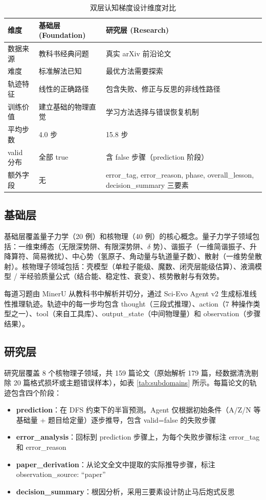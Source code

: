 \documentclass[12pt,a4paper]{article}
\begin{document}
\begin{table}[h]
\centering
\caption{双层认知梯度设计维度对比}
\label{tab:two_layer}
\begin{tabular}{p{3cm}p{5cm}p{5cm}}
\toprule
\textbf{维度} & \textbf{基础层 (Foundation)} & \textbf{研究层 (Research)} \\
\midrule
数据来源 & 教科书经典问题 & 真实 arXiv 前沿论文 \\
难度 & 标准解法已知 & 最优方法需要探索 \\
轨迹特征 & 线性的正确路径 & 包含失败、修正与反思的非线性路径 \\
训练价值 & 建立基础的物理直觉 & 学习方法选择与错误恢复机制 \\
平均步数 & 4.0 步 & 15.8 步 \\
valid 分布 & 全部 true & 含 false 步骤（prediction 阶段） \\
额外字段 & 无 & error\_tag, error\_reason, phase, overall\_lesson, decision\_summary 三要素 \\
\bottomrule
\end{tabular}
\end{table}

\subsection{基础层}

基础层覆盖量子力学（20 例）和核物理（40 例）的核心概念。量子力学子领域包括：一维束缚态（无限深势阱、有限深势阱、$\delta$ 势）、谐振子（一维简谐振子、升降算符、简易微扰）、中心势（氢原子、角动量与轨道量子数）、散射（一维势垒散射）。核物理子领域包括：壳模型（单粒子能级、魔数、闭壳层能级估算）、液滴模型 / 半经验质量公式（结合能、稳定性、衰变）、核势散射与有效势。

每道习题由 MinerU 从教科书中解析并切分，通过 Sci-Evo Agent v2 生成标准线性推理轨迹。轨迹中的每一步均包含 thought（三段式推理）、action（7 种操作类型之一）、tool（来自工具库）、output\_state（中间物理量）和 observation（步骤结果）。

\subsection{研究层}

研究层覆盖 8 个核物理子领域，共 159 篇论文（原始解析 179 篇，经数据清洗剔除 20 篇格式损坏或主题错误样本），如表 \ref{tab:subdomains} 所示。每篇论文的轨迹包含四个阶段：

\begin{itemize}
\item \textbf{prediction}：在 DFS 约束下的半盲预测。Agent 仅根据初始条件（A/Z/N 等基础量 + 题目给定量）逐步推导，包含 valid=false 的失败步骤
\item \textbf{error\_analysis}：回标到 prediction 步骤上，为每个失败步骤标注 error\_tag 和 error\_reason
\item \textbf{paper\_derivation}：从论文全文中提取的实际推导步骤，标注 observation\_source: ``paper''
\item \textbf{decision\_summary}：根因分析，采用三要素设计防止马后炮式反思
\end{itemize}
\end{document}
